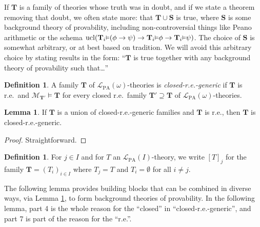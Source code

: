 \documentclass[reqno]{article}
\theoremstyle{definition}
\newtheorem{lemma}[theorem]{Lemma}
\newtheorem{definition}[theorem]{Definition}
\def\L{\mathscr{L}}
\def\M{\mathscr{M}}
\def\T{\mathbf{T}}
\def\S{\mathbf{S}}
\def\LPA{\L_{\mathrm{PA}}}
\renewcommand{\Pr}[1]{\T_{#1}\mbox{\small${\vDash}$}}
\newcommand{\ucl}[1]{\mathrm{ucl}(#1)}
\begin{document}
If $\T$ is a family of
theories whose truth was in doubt,
and if we state a theorem removing that doubt,
we often state more:
that $\T\cup\S$
is true,
where $\S$ is some
background theory of provability, including non-controversial things
like Peano arithmetic or the schema $\ucl{\Pr i(\phi\rightarrow\psi)\rightarrow\Pr i\phi\rightarrow\Pr i\psi}$.
The choice of $\S$ is somewhat arbitrary, or at best based on tradition.
We will avoid this arbitrary choice by stating results in the form:
``$\T$ is true together with any background theory of provability such that\ldots''


\begin{definition}
\label{closedregenericdefn}
A family $\T$ of $\LPA(\omega)$-theories is
\emph{closed-r.e.-generic}
if $\T$ is r.e.~and
$\M_{\T'}\models\T$ for every closed r.e.~family $\T'\supseteq\T$ of $\LPA(\omega)$-theories.
\end{definition}


\begin{lemma}
\label{genericclosedreunion}
If $\T$ is a union of closed-r.e.-generic families
and $\T$ is r.e., then $\T$ is closed-r.e.-generic.
\end{lemma}

\begin{proof}
Straightforward.
\end{proof}

\begin{definition}
For $j\in I$ and for $T$ an $\LPA(I)$-theory,
we write $[T]_j$ for the family $\T=(T_i)_{i\in I}$
where $T_j=T$ and $T_i=\emptyset$ for all $i\not=j$.
\end{definition}


The following lemma provides building blocks
that can be combined in diverse ways, via Lemma \ref{genericclosedreunion}, to
form background theories of provability.  In the following lemma, part 4 is the
whole reason for the ``closed'' in ``closed-r.e.-generic'', and part 7 is
part of the reason for the ``r.e.''.
\end{document}
